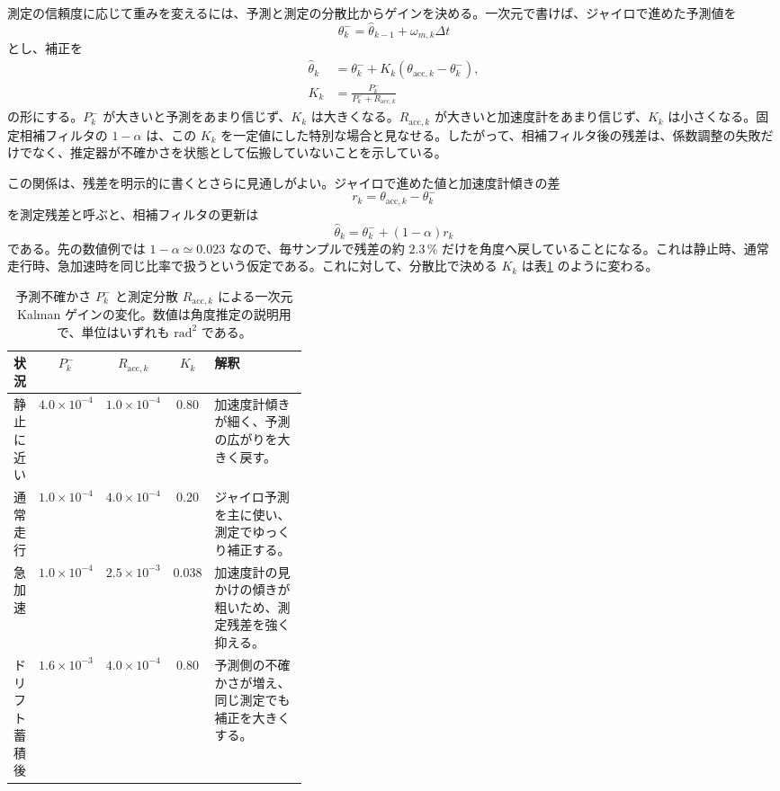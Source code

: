 測定の信頼度に応じて重みを変えるには、予測と測定の分散比からゲインを決める。一次元で書けば、ジャイロで進めた予測値を
\begin{equation}
  \theta^-_k
  =
  \hat{\theta}_{k-1}+\omega_{m,k}\Delta t
\end{equation}
とし、補正を
\begin{align}
  \hat{\theta}_k
  &=
  \theta^-_k
  +K_k\left(\theta_{\mathrm{acc},k}-\theta^-_k\right),\\
  K_k
  &=
  \frac{P^-_k}{P^-_k+R_{\mathrm{acc},k}}
\end{align}
の形にする。$P^-_k$ が大きいと予測をあまり信じず、$K_k$ は大きくなる。$R_{\mathrm{acc},k}$ が大きいと加速度計をあまり信じず、$K_k$ は小さくなる。固定相補フィルタの $1-\alpha$ は、この $K_k$ を一定値にした特別な場合と見なせる。したがって、相補フィルタ後の残差は、係数調整の失敗だけでなく、推定器が不確かさを状態として伝搬していないことを示している。

この関係は、残差を明示的に書くとさらに見通しがよい。ジャイロで進めた値と加速度計傾きの差
\begin{equation}
  r_k=\theta_{\mathrm{acc},k}-\theta^-_k
\end{equation}
を測定残差と呼ぶと、相補フィルタの更新は
\begin{equation}
  \hat{\theta}_k
  =
  \theta^-_k+(1-\alpha)r_k
\end{equation}
である。先の数値例では $1-\alpha\simeq0.023$ なので、毎サンプルで残差の約 $2.3\,\%$ だけを角度へ戻していることになる。これは静止時、通常走行時、急加速時を同じ比率で扱うという仮定である。これに対して、分散比で決める $K_k$ は表\ref{tab:flow-six-scalar-kalman-gain} のように変わる。

\begin{table}[tb]
  \centering
  \caption{予測不確かさ $P^-_k$ と測定分散 $R_{\mathrm{acc},k}$ による一次元 Kalman ゲインの変化。数値は角度推定の説明用で、単位はいずれも $\mathrm{rad}^2$ である。}
  \label{tab:flow-six-scalar-kalman-gain}
  \begin{tabular}{c|c|c|c|p{0.38\linewidth}}
    状況 & $P^-_k$ & $R_{\mathrm{acc},k}$ & $K_k$ & 解釈\\
    \hline
    静止に近い & $4.0\times10^{-4}$ & $1.0\times10^{-4}$ & $0.80$ & 加速度計傾きが細く、予測の広がりを大きく戻す。\\
    通常走行 & $1.0\times10^{-4}$ & $4.0\times10^{-4}$ & $0.20$ & ジャイロ予測を主に使い、測定でゆっくり補正する。\\
    急加速 & $1.0\times10^{-4}$ & $2.5\times10^{-3}$ & $0.038$ & 加速度計の見かけの傾きが粗いため、測定残差を強く抑える。\\
    ドリフト蓄積後 & $1.6\times10^{-3}$ & $4.0\times10^{-4}$ & $0.80$ & 予測側の不確かさが増え、同じ測定でも補正を大きくする。\\
  \end{tabular}
\end{table}

